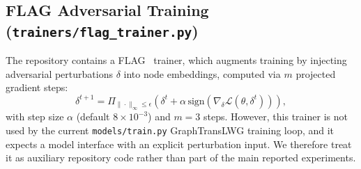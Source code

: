 \documentclass[11pt]{article}
\begin{document}
\subsection{FLAG Adversarial Training (\texttt{trainers/flag\_trainer.py})}

The repository contains a FLAG~\cite{kong2021flag} trainer, which augments training by injecting adversarial perturbations $\delta$ into node embeddings, computed via $m$ projected gradient steps:
\[
\delta^{t+1} = \Pi_{\|\cdot\|_\infty \leq \epsilon}\!\left(\delta^t + \alpha\,\mathrm{sign}(\nabla_\delta \mathcal{L}(\theta,\delta^t))\right),
\]
with step size $\alpha$ (default $8\times10^{-3}$) and $m=3$ steps. However, this trainer is not used by the current \texttt{models/train.py} GraphTransLWG training loop, and it expects a model interface with an explicit perturbation input. We therefore treat it as auxiliary repository code rather than part of the main reported experiments.



\end{document}
